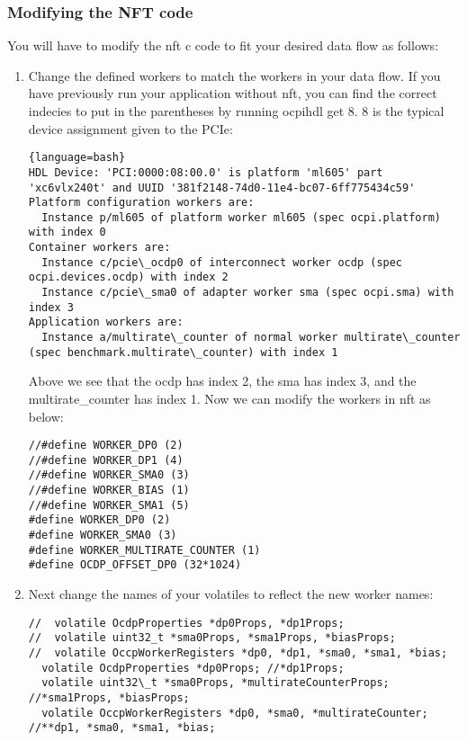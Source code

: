 \subsubsection{Modifying the NFT code}
You will have to modify the nft c code to fit your desired data flow as follows:  
\begin{enumerate}

\item Change the defined workers to match the workers in your data flow.  If you have previously run your application without nft, you can find the correct indecies to put in the parentheses by running ocpihdl get 8.  8 is the typical device assignment given to the PCIe:

\begin{lstlisting}{language=bash}
HDL Device: 'PCI:0000:08:00.0' is platform 'ml605' part 'xc6vlx240t' and UUID '381f2148-74d0-11e4-bc07-6ff775434c59'
Platform configuration workers are:
  Instance p/ml605 of platform worker ml605 (spec ocpi.platform) with index 0
Container workers are:
  Instance c/pcie\_ocdp0 of interconnect worker ocdp (spec ocpi.devices.ocdp) with index 2
  Instance c/pcie\_sma0 of adapter worker sma (spec ocpi.sma) with index 3
Application workers are:
  Instance a/multirate\_counter of normal worker multirate\_counter (spec benchmark.multirate\_counter) with index 1
\end{lstlisting}

 Above we see that the ocdp has index 2, the sma has index 3, and the multirate\_counter has index 1.  Now we can modify the workers in nft as below:

\begin{lstlisting}[language=customc]
//#define WORKER_DP0 (2)
//#define WORKER_DP1 (4)
//#define WORKER_SMA0 (3)
//#define WORKER_BIAS (1)
//#define WORKER_SMA1 (5)
#define WORKER_DP0 (2)
#define WORKER_SMA0 (3)
#define WORKER_MULTIRATE_COUNTER (1)
#define OCDP_OFFSET_DP0 (32*1024)
\end{lstlisting}


\item Next change the names of your volatiles to reflect the new worker names:
\begin{lstlisting}[language=customc]
//  volatile OcdpProperties *dp0Props, *dp1Props;
//  volatile uint32_t *sma0Props, *sma1Props, *biasProps;
//  volatile OccpWorkerRegisters *dp0, *dp1, *sma0, *sma1, *bias;
  volatile OcdpProperties *dp0Props; //*dp1Props;
  volatile uint32\_t *sma0Props, *multirateCounterProps; //*sma1Props, *biasProps;
  volatile OccpWorkerRegisters *dp0, *sma0, *multirateCounter; //**dp1, *sma0, *sma1, *bias;


\end{lstlisting}
\end{enumerate}
